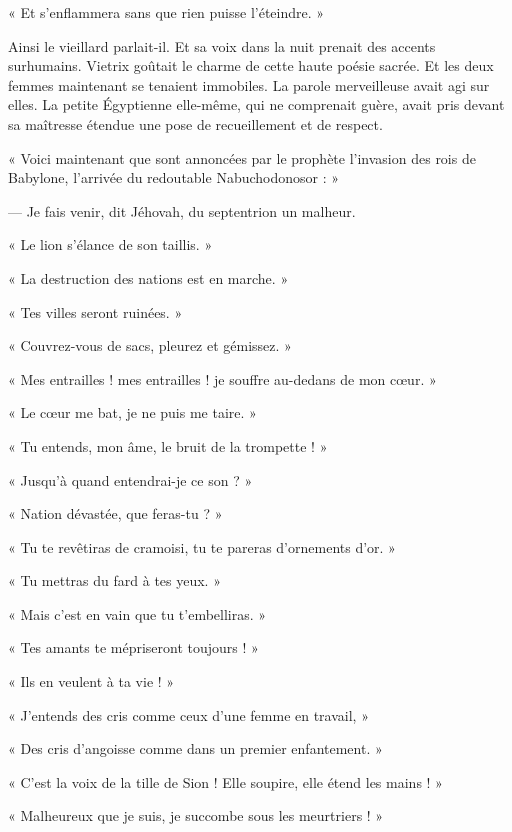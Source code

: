 \documentclass[a4paper, 11pt, oneside, polutonikogreek, french]{article}
\begin{document}
« Et s'enflammera sans que rien puisse l'éteindre. »

\bigskip
\centerline{\EightStarTaper}
\centerline{\EightStarTaper\EightStarTaper}
\bigskip

Ainsi le vieillard parlait-il. Et sa voix dans la nuit prenait des accents surhumains. Vietrix goûtait le charme de cette haute poésie sacrée. Et les deux femmes maintenant se tenaient immobiles. La parole merveilleuse avait agi sur elles. La petite Égyptienne elle-même, qui ne comprenait guère, avait pris devant sa maîtresse étendue une pose de recueillement et de respect.

\bigskip
\centerline{\EightStarTaper}
\centerline{\EightStarTaper\EightStarTaper}
\bigskip

« Voici maintenant que sont annoncées par le prophète l'invasion des rois de Babylone, l'arrivée du redoutable Nabuchodonosor : »

--- Je fais venir, dit Jéhovah, du septentrion un malheur.

« Le lion s'élance de son taillis. »

« La destruction des nations est en marche. »

« Tes villes seront ruinées. »

« Couvrez-vous de sacs, pleurez et gémissez. »

« Mes entrailles ! mes entrailles ! je souffre au-dedans de mon cœur. »

« Le cœur me bat, je ne puis me taire. »

« Tu entends, mon âme, le bruit de la trompette ! »

« Jusqu'à quand entendrai-je ce son ? »

« Nation dévastée, que feras-tu ? »

« Tu te revêtiras de cramoisi, tu te pareras d'ornements d'or. »

« Tu mettras du fard à tes yeux. »

« Mais c'est en vain que tu t'embelliras. »

« Tes amants te mépriseront toujours ! »

« Ils en veulent à ta vie ! »

« J'entends des cris comme ceux d'une femme en travail, »

« Des cris d'angoisse comme dans un premier enfantement. »

« C'est la voix de la tille de Sion ! Elle soupire, elle étend les mains ! »

« Malheureux que je suis, je succombe sous les meurtriers ! »
\end{document}
